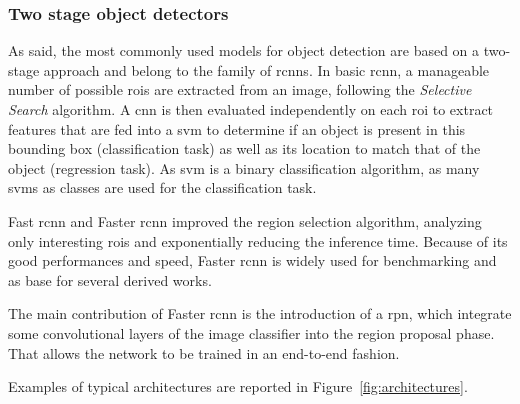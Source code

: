 \documentclass[%
    corpo=12pt,
    twoside,
    stile=classica,   
    tipotesi=magistrale,
    evenboxes,
    english,
	numerazioneromana,
]{toptesi}
\begin{document}
\subsubsection{Two stage object detectors}
As said, the most commonly used models for object detection are based on a two-stage approach and belong to the family of \glspl{rcnn}. In basic \gls{rcnn}\cite{girshick2014rich}, a manageable number of possible \glspl{roi} are extracted from an image, following the \textit{Selective Search} algorithm.
A \gls{cnn} is then evaluated independently on each \gls{roi} to extract features that are fed into a \gls{svm}
to determine if an object is present in this bounding box (classification task) as well as its location to match that of the object (regression task). As \gls{svm} is a binary classification algorithm, as many \glspl{svm} as classes are used for the classification task.

\medskip
Fast \gls{rcnn}\cite{girshick2015fast} and Faster \gls{rcnn}\cite{ren2016faster} improved the region selection algorithm, analyzing only interesting \glspl{roi} and exponentially reducing the inference time. Because of its good performances and speed, Faster \gls{rcnn} is widely used for benchmarking and as base for several derived works.

The main contribution of Faster \gls{rcnn} is the introduction of a \gls{rpn}, which integrate some convolutional layers of the image classifier into the region proposal phase. That allows the network to be trained in an end-to-end fashion.

Examples of typical architectures are reported in Figure~\ref{fig:architectures}.
\end{document}

